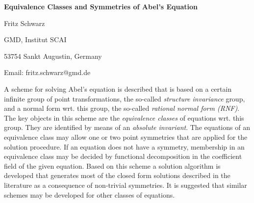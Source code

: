 

\centerline{\bf Equivalence Classes and Symmetries of Abel's Equation}

\vskip 0.3cm

\centerline{Fritz Schwarz}
\centerline{GMD, Institut SCAI}
\centerline{53754 Sankt Augustin, Germany}
\centerline{Email: fritz.schwarz@gmd.de}

\vskip 0.3cm

A scheme for solving Abel's equation is described that is based on a
certain infinite group of point transformations, the so-called {\em
structure invariance} group, and a normal form wrt. this group, the
so-called {\em rational normal form (RNF)}. The key objects in this
scheme are the {\em equivalence classes} of equations wrt. this group.
They are identified by means of an {\em absolute invariant}. The
equations of an equivalence class may allow one or two point symmetries
that are applied for the solution procedure. If an equation does not
have a symmetry, membership in an equivalence class may be decided by
functional decomposition in the coefficient field of the given
equation. Based on this scheme a solution algorithm is developed that
generates most of the closed form solutions described in the literature
as a consequence of non-trivial symmetries. It is suggested that
similar schemes may be developed for other classes of equations.


